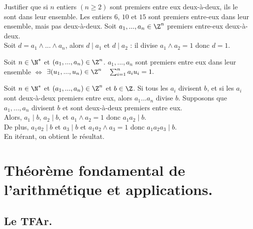 \documentclass[11pt]{article}
\begin{document}
\begin{ex}{}{}
    Justifier que si $n$ entiers $(n\geq2)$ sont premiers entre eux deux-à-deux, ils le sont dans leur ensemble.\n
    Les entiers $6$, $10$ et $15$ sont premiers entre-eux dans leur ensemble, mais pas deux-à-deux.
    \tcblower
    Soit $a_1,...,a_n\in\Z^n$ premiers entre-eux deux-à-deux.\\
    Soit $d=a_1\land ... \land a_n$, alors $d\mid a_1$ et $d\mid a_2$ : il divise $a_1\land a_2=1$ donc $d=1$.
\end{ex}

\begin{thm}{}{}
    Soit $n\in\N^*$ et $(a_1,...,a_n)\in\Z^n$.\n
    $a_1,...,a_n$ sont premiers entre eux dans leur ensemble $\iff$ $\exists(u_1,...,u_n)\in\Z^n\quad\sum_{i=1}^na_iu_i=1.$
\end{thm}

\begin{prop}{}{}
    Soit $n\in\N^*$ et $(a_1,...,a_n)\in\Z^n$ et $b\in\Z$.\n
    Si tous les $a_i$ divisent $b$, et si les $a_i$ sont deux-à-deux premiers entre eux, alors $a_1...a_n$ divise $b$.
    \tcblower
    Supposons que $a_1,...,a_n$ divisent $b$ et sont deux-à-deux premiers entre eux.\\
    Alors, $a_1 \mid b$, $a_2\mid b$, et $a_1 \land a_2=1$ donc $a_1a_2\mid b$.\\
    De plus, $a_1a_2 \mid b$ et $a_3 \mid b$ et $a_1a_2\land a_3=1$ donc $a_1a_2a_3\mid b$.\\
    En itérant, on obtient le résultat.
\end{prop}

\section{Théorème fondamental de l'arithmétique et applications.}
\subsection{Le TFAr.}
\end{document}
